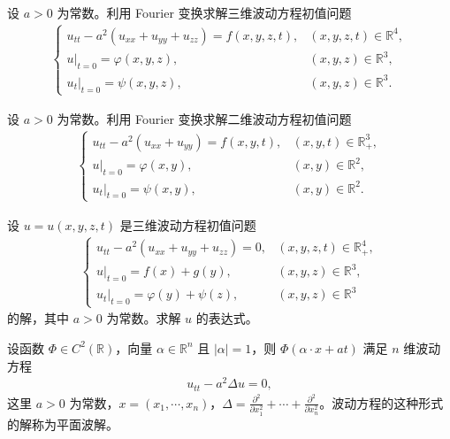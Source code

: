 \documentclass[../../main.tex]{subfiles}%
\begin{document}
\begin{example}
设 $a>0$ 为常数。利用 Fourier 变换求解三维波动方程初值问题
\begin{align*}
\begin{cases}
u_{tt}-a^2(u_{xx}+u_{yy}+u_{zz})=f(x,y,z,t), & (x,y,z,t)\in\mathbb{R}^4, \\
u|_{t=0}=\varphi(x,y,z), & (x,y,z)\in\mathbb{R}^3, \\
u_t|_{t=0}=\psi(x,y,z), & (x,y,z)\in\mathbb{R}^3.
\end{cases}
\end{align*}
\end{example}

\begin{example}
设 $a>0$ 为常数。利用 Fourier 变换求解二维波动方程初值问题
\begin{align*}
\begin{cases}
u_{tt}-a^2(u_{xx}+u_{yy})=f(x,y,t), & (x,y,t)\in\mathbb{R}_+^3, \\
u|_{t=0}=\varphi(x,y), & (x,y)\in\mathbb{R}^2, \\
u_t|_{t=0}=\psi(x,y), & (x,y)\in\mathbb{R}^2.
\end{cases}
\end{align*}
\end{example}

\begin{example}
设 $u=u(x,y,z,t)$ 是三维波动方程初值问题
\begin{align*}
\begin{cases}
u_{tt}-a^2(u_{xx}+u_{yy}+u_{zz})=0, & (x,y,z,t)\in\mathbb{R}_+^4, \\
u|_{t=0}=f(x)+g(y), & (x,y,z)\in\mathbb{R}^3, \\
u_t|_{t=0}=\varphi(y)+\psi(z), & (x,y,z)\in\mathbb{R}^3
\end{cases}
\end{align*}
的解，其中 $a>0$ 为常数。求解 $u$ 的表达式。
\end{example}

\begin{example}
设函数 $\Phi\in C^2(\mathbb{R})$，向量 $\alpha\in\mathbb{R}^n$ 且 $|\alpha|=1$，则 $\Phi(\alpha\cdot x+at)$ 满足 $n$ 维波动方程
\begin{align*}
u_{tt}-a^2\Delta u=0,
\end{align*}
这里 $a>0$ 为常数，$x=(x_1,\cdots,x_n)$，$\Delta=\frac{\partial^2}{\partial x_1^2}+\cdots+\frac{\partial^2}{\partial x_n^2}$。波动方程的这种形式的解称为平面波解。
\end{example}
\end{document}
